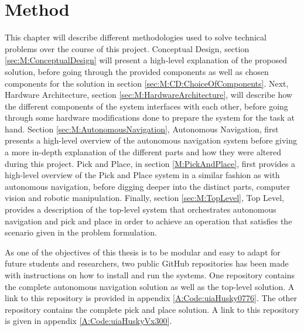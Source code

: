 \chapter{Method}

This chapter will describe different methodologies used to solve technical problems over the course of this project.
Conceptual Design, section \ref{sec:M:ConceptualDesign} will present a high-level explanation of the proposed solution, before going through the provided components as well as chosen components for the solution in section \ref{sec:M:CD:ChoiceOfComponents}. Next, Hardware Architecture, section \ref{sec:M:HardwareArchitecture}, will describe how the different components of the system interfaces with each other, before going through some hardware modifications done to prepare the system for the task at hand. Section \ref{sec:M:AutonomousNavigation}, Autonomous Navigation, first presents a high-level overview of the autonomous navigation system before giving a more in-depth explanation of the different parts and how they were altered during this project. Pick and Place, in section \ref{M:PickAndPlace}, first provides a high-level overview of the Pick and Place system in a similar fashion as with autonomous navigation, before digging deeper into the distinct parts, computer vision and robotic manipulation. Finally, section \ref{sec:M:TopLevel}, Top Level, provides a description of the top-level system that orchestrates autonomous navigation and pick and place in order to achieve an operation that satisfies the scenario given in the problem formulation.

As one of the objectives of this thesis is to be modular and easy to adapt for future students and researchers, two public GitHub repositories has been made with instructions on how to install and run the systems. One repository contains the complete autonomous navigation solution as well as the top-level solution. A link to this repository is provided in appendix \ref{A:Code:uiaHusky0776}. The other repository contains the complete pick and place solution. A link to this repository is given in appendix \ref{A:Code:uiaHuskyVx300}.

